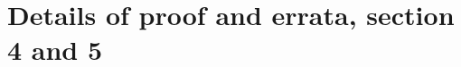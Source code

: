 \documentclass{report}
\theoremstyle{definition}
\newtheorem{note}{Note}
\theoremstyle{definition}
\theoremstyle{plain}
\numberwithin{theorem}{section}
\numberwithin{remark}{section}
\numberwithin{equation}{section}
\newcommand{\abs}[1]{\left\lvert#1\right\rvert}
\begin{document}
\section{Details of proof and errata, section 4 and 5}
\end{document}
